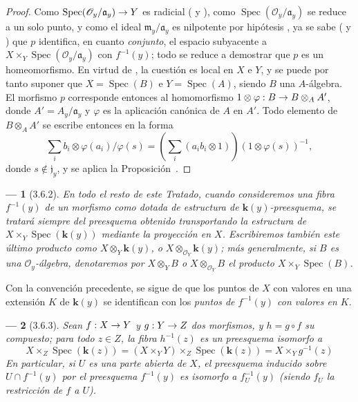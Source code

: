 \documentclass[oneside]{amsart}
\theoremstyle{ega-env-style}
\newtheorem*{env}{---}
\theoremstyle{ega-thm-env-style}
\theoremstyle{ega-defn-env-style}
\def\mathcal{\mathscr}
\renewcommand{\to}{\mathchoice{\longrightarrow}{\rightarrow}{\rightarrow}{\rightarrow}}
\newcommand{\oldpage}[2][]{{\marginnote{\normalfont{\textbf{#1}~|~#2}}}\ignorespaces}
\let\EGAOriginalLabel\label
\renewcommand{\label}[1]{\phantomsection\EGAOriginalLabel{#1}}
\begin{document}
\begin{proof}
Como $\operatorname{Spec}(\mathcal{O}_y/\mathfrak{a}_y)\to Y$ es radicial ( y ), como $\operatorname{Spec}(\mathcal{O}_y/\mathfrak{a}_y)$ se reduce a un solo punto, y como el ideal $\mathfrak{m}_y/\mathfrak{a}_y$ es nilpotente por hipótesis , ya se sabe ( y ) que $p$ identifica, en cuanto \emph{conjunto}, el espacio subyacente a $X\times_Y\operatorname{Spec}(\mathcal{O}_y/\mathfrak{a}_y)$ con $f^{-1}(y)$; todo se reduce a demostrar que $p$ es un homeomorfismo.
En virtud de , la cuestión es local en $X$ e $Y$, y se puede por tanto suponer que $X=\operatorname{Spec}(B)$ e $Y=\operatorname{Spec}(A)$, siendo $B$ una $A$-álgebra.
El morfismo $p$ corresponde entonces al homomorfismo $1\otimes\varphi:B\to B\otimes_A A'$, donde $A'=A_y/\mathfrak{a}_y$ y $\varphi$ es la aplicación canónica de $A$ en $A'$.
Todo elemento de $B\otimes_A A'$ se escribe entonces en la forma
\label{I.3.6.1.localization-fraction-fr}
\[
  \sum_i b_i\otimes\varphi(a_i)/\varphi(s)
  =\left(\sum_i(a_i b_i\otimes 1)\right)(1\otimes\varphi(s))^{-1},
\]
donde $s\notin\mathfrak{j}_y$, y se aplica la Proposición~.
\end{proof}

\begin{env}[3.6.2]
\label{I.3.6.2}
En todo el resto de este Tratado, cuando consideremos una \emph{fibra} $f^{-1}(y)$ de un morfismo como dotada de estructura de $\boldsymbol{k}(y)$-preesquema, \emph{se tratará siempre del preesquema obtenido transportando la estructura de $X\times_Y\operatorname{Spec}(\boldsymbol{k}(y))$ mediante la proyección en $X$}.
Escribiremos también este último producto como $X\otimes_Y \boldsymbol{k}(y)$, o $X\otimes_{\mathcal{O}_Y}\boldsymbol{k}(y)$; más generalmente, si $B$ es una $\mathcal{O}_y$-álgebra, denotaremos por $X\otimes_Y B$ o $X\otimes_{\mathcal{O}_Y}B$ el producto $X\times_Y\operatorname{Spec}(B)$.
\end{env}

Con la convención precedente, se sigue de  que los puntos de $X$ con valores en una extensión $K$ de $\boldsymbol{k}(y)$ se identifican con los \emph{puntos de $f^{-1}(y)$ con valores en $K$}.

\begin{env}[3.6.3]
\label{I.3.6.3}
Sean $f:X\to Y$ y $g:Y\to Z$ dos morfismos, y $h=g\circ f$ su compuesto; para todo $z\in Z$, la fibra $h^{-1}(z)$ es un preesquema isomorfo a
\label{I.3.6.3.fibre-composition-fr}
\[
  X\times_Z\operatorname{Spec}(\boldsymbol{k}(z))
  =(X\times_Y Y)\times_Z\operatorname{Spec}(\boldsymbol{k}(z))
  =X\times_Y g^{-1}(z)
\]
\oldpage[I]{118}En particular, si $U$ es una parte abierta de $X$, el preesquema inducido sobre $U\cap f^{-1}(y)$ por el preesquema $f^{-1}(y)$ es isomorfo a $f_U^{-1}(y)$ (siendo $f_U$ la restricción de $f$ a $U$).
\end{env}
\end{document}
